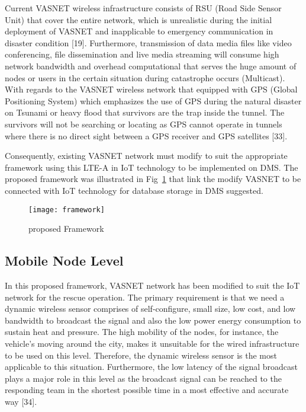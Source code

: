 \documentclass{article}
\begin{document}
Current VASNET wireless infrastructure consists of RSU (Road Side Sensor Unit) that cover the entire network, which is unrealistic during the initial deployment of VASNET and inapplicable to emergency communication in disaster condition [19]. Furthermore, transmission of data media files like video conferencing, file dissemination and live media streaming will consume high network bandwidth and overhead computational that serves the huge amount of nodes or users in the certain situation during catastrophe occurs (Multicast). With regards to the VASNET wireless network that equipped with GPS (Global Positioning System) which emphasizes the use of GPS during the natural disaster on Tsunami or heavy flood that survivors are the trap inside the tunnel. The survivors will not be searching or locating as GPS cannot operate in tunnels where there is no direct sight between a GPS receiver and GPS satellites [33].

Consequently, existing VASNET network must modify to suit the appropriate framework using this LTE-A in IoT technology to be implemented on DMS. The proposed framework was illustrated in Fig~\ref{framework} that link the modify VASNET to be connected with IoT technology for database storage in DMS suggested.

\begin{center}
\begin{figure}[h]
\texttt{[image: framework]}\caption{proposed Framework}\label{framework}
\end{figure}
\end{center}

\subsection{Mobile Node Level}

In this proposed framework, VASNET network has been modified to suit the IoT network for the rescue operation. The primary requirement is that we need a dynamic wireless sensor comprises of self-configure, small size, low cost, and low bandwidth to broadcast the signal and also the low power energy consumption to sustain heat and pressure. The high mobility of the nodes, for instance, the vehicle’s moving around the city, makes it unsuitable for the wired infrastructure to be used on this level. Therefore, the dynamic wireless sensor is the most applicable to this situation. Furthermore, the low latency of the signal broadcast plays a major role in this level as the broadcast signal can be reached to the responding team in the shortest possible time in a most effective and accurate way [34].
\end{document}
